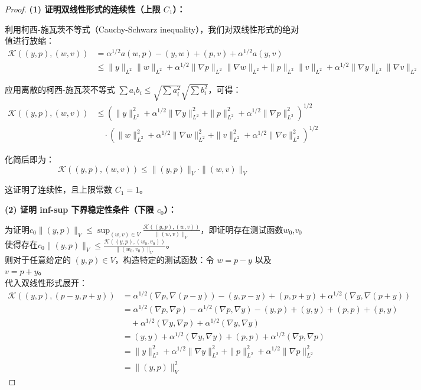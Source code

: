 \documentclass{xmu}
\theoremstyle{plain}
\theoremstyle{remark}
\begin{document}
\begin{proof}
  \textbf{(1) 证明双线性形式的连续性（上限 $C_1$）：}

  利用柯西-施瓦茨不等式（Cauchy-Schwarz inequality），我们对双线性形式的绝对值进行放缩：
  \begin{align*}
  \mathcal{K}((y,p), (w,v))
  &=\alpha^{1/2}a(w,p)-(y,w)+(p,v)+\alpha^{1/2}a(y,v)\\
  &\le \|y\|_{L^2} \|w\|_{L^2} + \alpha^{1/2}\|\nabla p\|_{L^2} \|\nabla w\|_{L^2} + \|p\|_{L^2} \|v\|_{L^2} + \alpha^{1/2}\|\nabla y\|_{L^2} \|\nabla v\|_{L^2}
  \end{align*}

  应用离散的柯西-施瓦茨不等式 $\sum a_i b_i \le \sqrt{\sum a_i^2}\sqrt{\sum b_i^2}$，可得：
  \begin{align*}
  \mathcal{K}((y,p), (w,v)) &\le \left(\|y\|_{L^2}^2 + \alpha^{1/2}\|\nabla y\|_{L^2}^2 + \|p\|_{L^2}^2 + \alpha^{1/2}\|\nabla p\|_{L^2}^2 \right)^{1/2} \\
  &\quad \cdot \left(\|w\|_{L^2}^2 + \alpha^{1/2}\|\nabla w\|_{L^2}^2 + \|v\|_{L^2}^2 + \alpha^{1/2}\|\nabla v\|_{L^2}^2 \right)^{1/2}
  \end{align*}

  化简后即为：
  \begin{equation}
  \mathcal{K}((y,p), (w,v)) \le \|(y,p)\|_V \cdot \|(w,v)\|_V
  \end{equation}

  这证明了连续性，且上限常数 $C_1 = 1$。

  \medskip
  \textbf{(2) 证明 inf-sup 下界稳定性条件（下限 $c_0$）：}

  为证明$c_0 \|(y,p)\|_V \le \sup_{(w,v)\in V} \frac{\mathcal{K}((y,p),(w,v))}{\|(w,v)\|_V}$，即证明存在测试函数$w_0$,$v_0$使得存在$c_0 \|(y,p)\|_V \le \frac{\mathcal{K}((y,p),(w_0,v_0))}{\|(w_0,v_0)\|_V}$。\\

  则对于任意给定的 $(y,p) \in V$，构造特定的测试函数：令 $w = p - y$ 以及 $v = p + y$。\\

  代入双线性形式展开：
  \begin{align*}
  \mathcal{K}((y,p), (p-y, p+y)) &= \alpha^{1/2}(\nabla p, \nabla(p-y)) - (y, p-y) + (p, p+y) + \alpha^{1/2}(\nabla y, \nabla(p+y)) \\
  &= \alpha^{1/2}(\nabla p, \nabla p) - \alpha^{1/2}(\nabla p, \nabla y) - (y,p) + (y,y) + (p,p) + (p,y) \\
  &\quad + \alpha^{1/2}(\nabla y, \nabla p) + \alpha^{1/2}(\nabla y, \nabla y)\\
  &=(y,y)+ \alpha^{1/2}(\nabla y, \nabla y) + (p,p)+ \alpha^{1/2}(\nabla p, \nabla p)\\
  &=\|y\|_{L^2}^2 + \alpha^{1/2}\|\nabla y\|_{L^2}^2 + \|p\|_{L^2}^2 + \alpha^{1/2}\|\nabla p\|_{L^2}^2 \\
  &= \|(y,p)\|_V^2
  \end{align*}


\end{proof}
\end{document}
